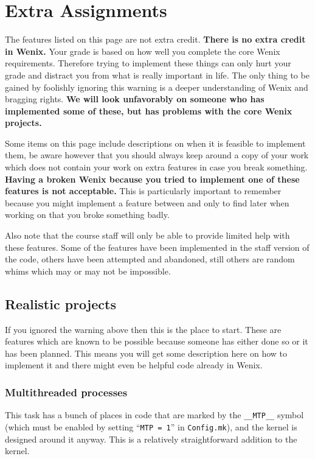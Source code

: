 \chapter{Extra Assignments}
\label{extra-asgn}


The features listed on this page are not extra credit. \textbf{There is no extra credit in Wenix.} Your grade is based on how well you complete the core Wenix requirements. Therefore trying to implement these things can only hurt your grade and distract you from what is really important in life. The only thing to be gained by foolishly ignoring this warning is a deeper understanding of Wenix and bragging rights. \textbf{We will look unfavorably on someone who has implemented some of these, but has problems with the core Wenix projects.}

Some items on this page include descriptions on when it is feasible to implement them, be aware however that you should always keep around a copy of your work which does not contain your work on extra features in case you break something. \textbf{Having a broken Wenix because you tried to implement one of these features is not acceptable.} This is particularly important to remember because you might implement a feature between  and  only to find later when working on  that you broke something badly.

Also note that the course staff will only be able to provide limited help with these features. Some of the features have been implemented in the staff version of the code, others have been attempted and abandoned, still others are random whims which may or may not be impossible.

\section{Realistic projects}
If you ignored the warning above then this is the place to start. These are features which are known to be possible because someone has either done so or it has been planned. This means you will get some description here on how to implement it and there might even be helpful code already in Wenix.

\subsection{Multithreaded processes}
This task has a bunch of places in code that are marked by the \texttt{\_\_MTP\_\_} symbol (which must be enabled by setting ``\texttt{MTP = 1}'' in \texttt{Config.mk}), and the kernel is designed around it anyway. This is a relatively straightforward addition to the kernel.

